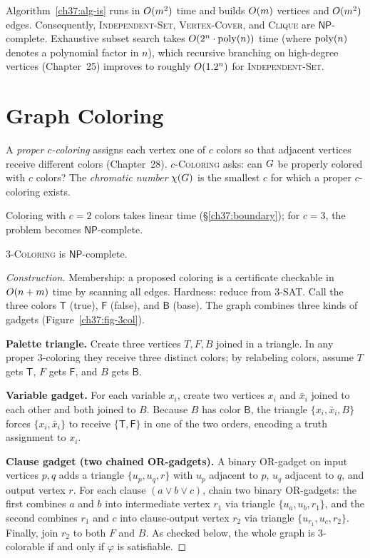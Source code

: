 \begin{complexitybox}
Algorithm~\ref{ch37:alg-is} runs in $O(m^2)$ time and builds $O(m)$ vertices and $O(m^2)$ edges.
Consequently, \textsc{Independent-Set}, \textsc{Vertex-Cover}, and
\textsc{Clique} are $\mathsf{NP}$-complete. Exhaustive subset search takes $O(2^n\cdot\operatorname{poly}(n))$ time (where $\operatorname{poly}(n)$ denotes a polynomial factor in $n$), which recursive branching on high-degree vertices (Chapter~25) improves to roughly $O(1.2^n)$ for \textsc{Independent-Set}.
\end{complexitybox}

\section{Graph Coloring}
\label{ch37:coloring}

A \emph{proper $c$-coloring} assigns each vertex one of $c$ colors so that
adjacent vertices receive different colors (Chapter~28). \textsc{$c$-Coloring} asks: can $G$ be properly colored
with $c$ colors? The \emph{chromatic number} $\chi(G)$ is the smallest $c$ for which a proper $c$-coloring exists.

Coloring with $c=2$ colors takes linear time (\S\ref{ch37:boundary}); for $c=3$, the problem becomes $\mathsf{NP}$-complete.

\begin{theorem}
\label{ch37:thm-3col}
\textsc{3-Coloring} is $\mathsf{NP}$-complete.
\end{theorem}

\begin{proof}[Construction]
Membership: a proposed coloring is a certificate checkable in $O(n+m)$ time by scanning all edges. Hardness:
reduce from \textsc{3-SAT}. Call the three colors $\mathsf{T}$ (true), $\mathsf{F}$ (false), and $\mathsf{B}$
(base). The graph combines three kinds of gadgets (Figure~\ref{ch37:fig-3col}).

\textbf{Palette triangle.} Create three vertices $T,F,B$ joined in a triangle.
In any proper 3-coloring they receive three distinct colors; by relabeling colors, assume $T$ gets $\mathsf{T}$,
$F$ gets $\mathsf{F}$, and $B$ gets $\mathsf{B}$.

\textbf{Variable gadget.} For each variable $x_i$, create two vertices $x_i$ and $\bar{x}_i$
joined to each other and both joined to $B$. Because $B$ has color $\mathsf{B}$, the triangle $\{x_i,\bar{x}_i,B\}$
forces $\{x_i,\bar{x}_i\}$ to receive $\{\mathsf{T},\mathsf{F}\}$ in one of the two orders, encoding a truth assignment to $x_i$.

\textbf{Clause gadget (two chained OR-gadgets).} A binary OR-gadget on input vertices
$p,q$ adds a triangle $\{u_p,u_q,r\}$ with $u_p$ adjacent to $p$, $u_q$ adjacent to $q$, and output vertex $r$. For each clause $(a\vee b\vee c)$, chain two binary OR-gadgets: the first combines $a$ and $b$ into intermediate vertex $r_1$ via triangle $\{u_a,u_b,r_1\}$, and the second combines $r_1$ and $c$ into clause-output vertex $r_2$ via triangle $\{u_{r_1},u_c,r_2\}$. Finally, join $r_2$ to both $F$ and $B$. As checked below, the whole graph is 3-colorable if and only if $\varphi$ is satisfiable.
\end{proof}

